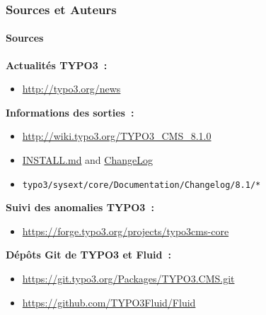 \begin{frame}[fragile]
	\frametitle{Sources et Auteurs}
	\framesubtitle{Sources}

	\textbf{Actualités TYPO3~:}
		\begin{itemize}\smaller
			\item \url{http://typo3.org/news}
		\end{itemize}

	\textbf{Informations des sorties~:}
		\begin{itemize}\smaller
			\item \url{http://wiki.typo3.org/TYPO3_CMS_8.1.0}
			\item \href{https://github.com/TYPO3/TYPO3.CMS/blob/master/INSTALL.md}{INSTALL.md}
				and \href{https://github.com/TYPO3/TYPO3.CMS/tree/master/typo3/sysext/core/Documentation/Changelog}{ChangeLog}
			\item \texttt{typo3/sysext/core/Documentation/Changelog/8.1/*}
		\end{itemize}

	\textbf{Suivi des anomalies TYPO3~:}
		\begin{itemize}\smaller
			\item \url{https://forge.typo3.org/projects/typo3cms-core}
		\end{itemize}

	\textbf{Dépôts Git de TYPO3 et Fluid~:}
		\begin{itemize}\smaller
			\item \url{https://git.typo3.org/Packages/TYPO3.CMS.git}
			\item \url{https://github.com/TYPO3Fluid/Fluid}
		\end{itemize}

\end{frame}


